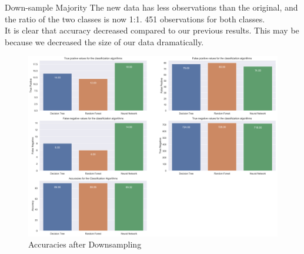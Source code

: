 Down-sample Majority
The new data has less observations than the original, and the ratio of the two classes is now 1:1. 451 observations for both classes.\\
It is clear that accuracy decreased compared to our previous results. This may be because we decreased the size of our data dramatically.
\begin{figure}[!ht]
 \centering
\includegraphics[width=5.1in]{assignment2/barcharts_algorithms.png}
\caption{\label{fig:fig5}Accuracies after Downsampling }
\end{figure}



